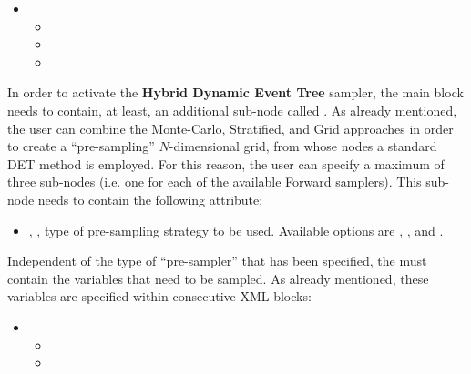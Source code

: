 
\begin{itemize}
  \item \variableDescription
  \variableChildrenIntro
  \begin{itemize}
    \item \distributionDescription
    \item \functionDescription
    \item \gridDescription
  \end{itemize}
\end{itemize}

In order to activate the \textbf{Hybrid Dynamic Event Tree}  sampler, the main
 block needs to contain, at least, an additional
sub-node called .
%
As already mentioned, the user can combine the Monte-Carlo, Stratified, and Grid
approaches in order to create a ``pre-sampling'' $N$-dimensional grid, from
whose nodes a standard DET method is employed.
%
For this reason, the user can specify a maximum of three
 sub-nodes (i.e. one for each of the available
Forward samplers).
%
This sub-node needs to contain the following attribute:
\begin{itemize}
  \item {}, , type of
    pre-sampling strategy to be used.
    Available options are , , and
    .
 \end{itemize}

Independent of the type of ``pre-sampler'' that has been specified, the
 must contain the variables that need to be sampled.
%
As already mentioned, these variables are specified within consecutive
 XML blocks:

\begin{itemize}
  \item \variableDescription
    \variableChildrenIntro
    \begin{itemize}
      \item \distributionDescription
      \item \functionDescription
    \end{itemize}
 \end{itemize}

